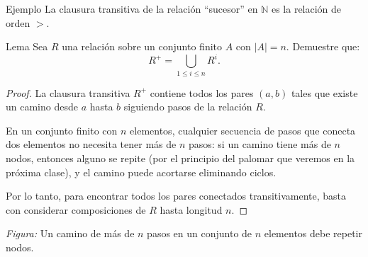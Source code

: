\begin{exampleblock}{Ejemplo}
La clausura transitiva de la relaci\'on ``sucesor'' en $\mathbb{N}$ es la relaci\'on de orden $>$.
\end{exampleblock}


\begin{thmblock}{Lema}
Sea $R$ una relaci\'on sobre un conjunto finito $A$ con $|A| = n$. Demuestre que:
\[ R^+ = \bigcup_{1 \leq i \leq n} R^i. \]
\end{thmblock}
\begin{proof}
La clausura transitiva \( R^+ \) contiene todos los pares \((a,b)\) tales que existe un camino desde \( a \) hasta \( b \) siguiendo pasos de la relación \( R \).

En un conjunto finito con \( n \) elementos, cualquier secuencia de pasos que conecta dos elementos no necesita tener más de \( n \) pasos: si un camino tiene más de \( n \) nodos, entonces alguno se repite (por el principio del palomar que veremos en la próxima clase), y el camino puede acortarse eliminando ciclos.

Por lo tanto, para encontrar todos los pares conectados transitivamente, basta con considerar composiciones de \( R \) hasta longitud \( n \). 
\end{proof}

\begin{center}
\end{center}

\vspace{-0.5em}
\begin{center}
\textit{Figura:} Un camino de más de \( n \) pasos en un conjunto de \( n \) elementos debe repetir nodos. 
\end{center}





